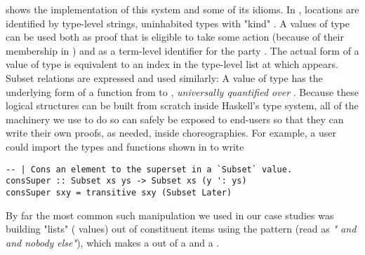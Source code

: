  shows the implementation of this system and some of its idioms.
In \MultiChor, locations are identified by type-level strings, uninhabited types with "kind" .
A values of type  can be used both
as proof that  is eligible to take some action (because of their membership in )
and as a term-level identifier for the party .
The actual form of a value of type 
is equivalent to an index in the type-level list  at which  appears.
Subset relations are expressed and used similarly:
A value of type  has the underlying form of a function
from  to ,
\emph{universally quantified over }.
Because these logical structures can be built from scratch inside Haskell's type system,
all of the machinery we use to do so can safely be exposed to end-users so that they can write their own proofs, as needed, inside choreographies.
For example, a user could import the types and functions shown in  to write
\begin{verbatim}
-- | Cons an element to the superset in a `Subset` value.
consSuper :: Subset xs ys -> Subset xs (y ': ys)
consSuper sxy = transitive sxy (Subset Later)
\end{verbatim}
By far the most common such manipulation we used in our case studies was
building "lists" ( values) out of constituent  items
using the pattern  (read as \emph{" and  and nobody else"}),
which makes a  out of a  and a .


